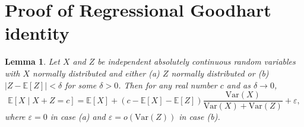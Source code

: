 \documentclass{article}
\theoremstyle{plain}
\newtheorem*{lemma}{Lemma}
\begin{document}
\section{Proof of Regressional Goodhart identity}\label{reg_goodhart_proof}

\begin{lemma}
Let $X$ and $Z$ be independent absolutely continuous random variables with $X$ normally distributed and either
(a) $Z$ normally distributed or (b) $\left|Z-\mathbb E\left[Z\right]\right|<\delta$ for some $\delta>0$. Then for any real number $c$ and as $\delta\to 0$,
\[\mathbb E\left[X\mid X+Z=c\right]=\mathbb E\left[X\right]+\left(c-\mathbb E\left[X\right]-\mathbb E\left[Z\right]\right)\frac{\mathrm{Var}\left(X\right)}{\mathrm{Var}\left(X\right)+\mathrm{Var}\left(Z\right)}+\varepsilon,\]
where $\varepsilon=0$ in case (a) and $\varepsilon=o\left(\mathrm{Var}\left(Z\right)\right)$ in case (b).
\end{lemma}
\end{document}
